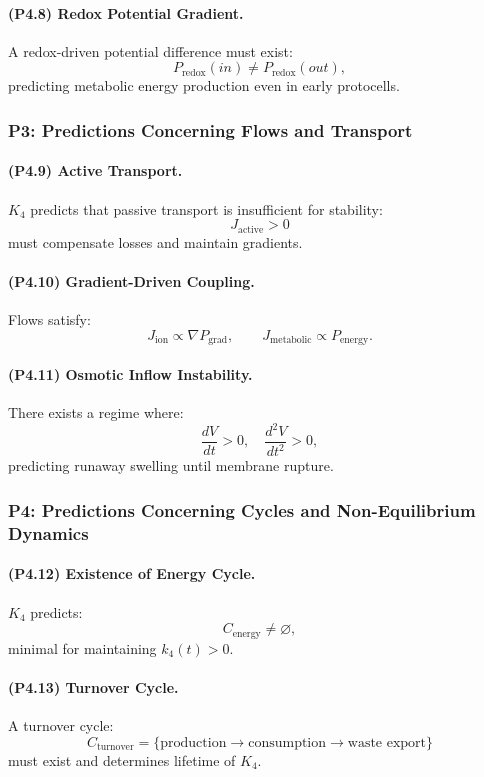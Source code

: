 \paragraph{(P4.8) Redox Potential Gradient.}
A redox-driven potential difference must exist:
\[
P_{\mathrm{redox}}(in) \neq P_{\mathrm{redox}}(out),
\]
predicting metabolic energy production even in early protocells.

\subsubsection{P3: Predictions Concerning Flows and Transport}

\paragraph{(P4.9) Active Transport.}
$K_4$ predicts that passive transport is insufficient for stability:
\[
J_{\mathrm{active}} > 0
\]
must compensate losses and maintain gradients.

\paragraph{(P4.10) Gradient-Driven Coupling.}
Flows satisfy:
\[
J_{\mathrm{ion}} \propto \nabla P_{\mathrm{grad}},
\qquad
J_{\mathrm{metabolic}} \propto P_{\mathrm{energy}}.
\]

\paragraph{(P4.11) Osmotic Inflow Instability.}
There exists a regime where:
\[
\frac{dV}{dt} > 0, \quad \frac{d^2V}{dt^2} > 0,
\]
predicting runaway swelling until membrane rupture.

\subsubsection{P4: Predictions Concerning Cycles and Non-Equilibrium Dynamics}

\paragraph{(P4.12) Existence of Energy Cycle.}
$K_4$ predicts:
\[
C_{\mathrm{energy}} \neq \varnothing,
\]
minimal for maintaining $k_4(t)>0$.

\paragraph{(P4.13) Turnover Cycle.}
A turnover cycle:
\[
C_{\mathrm{turnover}} = 
\{\text{production} \to \text{consumption} \to \text{waste export}\}
\]
must exist and determines lifetime of $K_4$.

